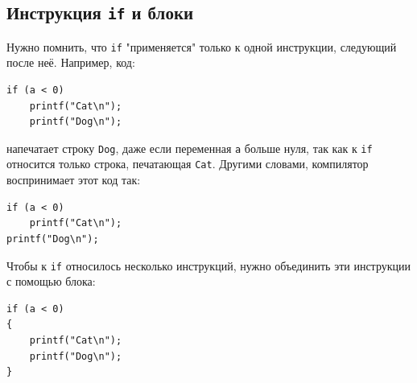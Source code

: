 \documentclass{article}
\begin{document}
\subsection*{Инструкция \texttt{if} и блоки}
Нужно помнить, что \texttt{if} "применяется"{} только к одной инструкции, следующий после неё. Например, код:
\begin{lstlisting}
if (a < 0)
    printf("Cat\n");
    printf("Dog\n");
\end{lstlisting}
напечатает строку \texttt{Dog}, даже если переменная \texttt{a} больше нуля, так как к \texttt{if} относится только строка, печатающая \texttt{Cat}. Другими словами, компилятор воспринимает этот код так:
\begin{lstlisting}
if (a < 0)
    printf("Cat\n");
printf("Dog\n");
\end{lstlisting}
Чтобы к \texttt{if} относилось несколько инструкций, нужно объединить эти инструкции с помощью блока:
\begin{lstlisting}
if (a < 0)
{
    printf("Cat\n");
    printf("Dog\n");
}
\end{lstlisting}
\end{document}
